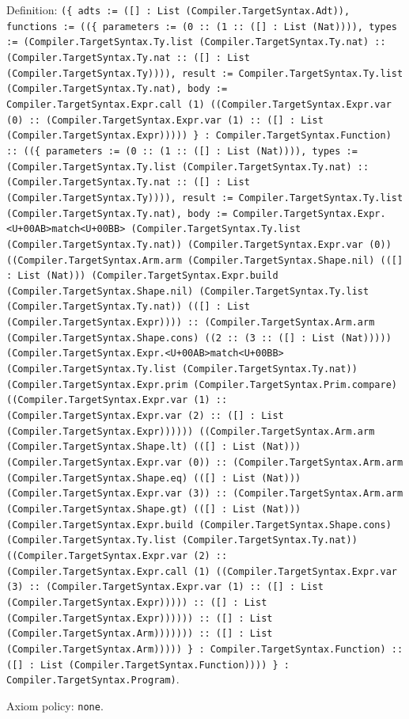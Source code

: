 \documentclass[11pt]{article}
\begin{document}
\noindent Definition: \texttt{(\{ adts := ([] : List (Compiler.TargetSyntax.Adt)), functions := ((\{ parameters := (0 :: (1 :: ([] : List (Nat)))), types := (Compiler.TargetSyntax.Ty.list (Compiler.TargetSyntax.Ty.nat) :: (Compiler.TargetSyntax.Ty.nat :: ([] : List (Compiler.TargetSyntax.Ty)))), result := Compiler.TargetSyntax.Ty.list (Compiler.TargetSyntax.Ty.nat), body := Compiler.TargetSyntax.Expr.call (1) ((Compiler.TargetSyntax.Expr.var (0) :: (Compiler.TargetSyntax.Expr.var (1) :: ([] : List (Compiler.TargetSyntax.Expr))))) \} : Compiler.TargetSyntax.Function) :: ((\{ parameters := (0 :: (1 :: ([] : List (Nat)))), types := (Compiler.TargetSyntax.Ty.list (Compiler.TargetSyntax.Ty.nat) :: (Compiler.TargetSyntax.Ty.nat :: ([] : List (Compiler.TargetSyntax.Ty)))), result := Compiler.TargetSyntax.Ty.list (Compiler.TargetSyntax.Ty.nat), body := Compiler.TargetSyntax.Expr.<U+00AB>match<U+00BB> (Compiler.TargetSyntax.Ty.list (Compiler.TargetSyntax.Ty.nat)) (Compiler.TargetSyntax.Expr.var (0)) ((Compiler.TargetSyntax.Arm.arm (Compiler.TargetSyntax.Shape.nil) (([] : List (Nat))) (Compiler.TargetSyntax.Expr.build (Compiler.TargetSyntax.Shape.nil) (Compiler.TargetSyntax.Ty.list (Compiler.TargetSyntax.Ty.nat)) (([] : List (Compiler.TargetSyntax.Expr)))) :: (Compiler.TargetSyntax.Arm.arm (Compiler.TargetSyntax.Shape.cons) ((2 :: (3 :: ([] : List (Nat))))) (Compiler.TargetSyntax.Expr.<U+00AB>match<U+00BB> (Compiler.TargetSyntax.Ty.list (Compiler.TargetSyntax.Ty.nat)) (Compiler.TargetSyntax.Expr.prim (Compiler.TargetSyntax.Prim.compare) ((Compiler.TargetSyntax.Expr.var (1) :: (Compiler.TargetSyntax.Expr.var (2) :: ([] : List (Compiler.TargetSyntax.Expr)))))) ((Compiler.TargetSyntax.Arm.arm (Compiler.TargetSyntax.Shape.lt) (([] : List (Nat))) (Compiler.TargetSyntax.Expr.var (0)) :: (Compiler.TargetSyntax.Arm.arm (Compiler.TargetSyntax.Shape.eq) (([] : List (Nat))) (Compiler.TargetSyntax.Expr.var (3)) :: (Compiler.TargetSyntax.Arm.arm (Compiler.TargetSyntax.Shape.gt) (([] : List (Nat))) (Compiler.TargetSyntax.Expr.build (Compiler.TargetSyntax.Shape.cons) (Compiler.TargetSyntax.Ty.list (Compiler.TargetSyntax.Ty.nat)) ((Compiler.TargetSyntax.Expr.var (2) :: (Compiler.TargetSyntax.Expr.call (1) ((Compiler.TargetSyntax.Expr.var (3) :: (Compiler.TargetSyntax.Expr.var (1) :: ([] : List (Compiler.TargetSyntax.Expr))))) :: ([] : List (Compiler.TargetSyntax.Expr)))))) :: ([] : List (Compiler.TargetSyntax.Arm))))))) :: ([] : List (Compiler.TargetSyntax.Arm))))) \} : Compiler.TargetSyntax.Function) :: ([] : List (Compiler.TargetSyntax.Function)))) \} : Compiler.TargetSyntax.Program)}.\par
\noindent Axiom policy: \texttt{none}.\par
\end{document}
